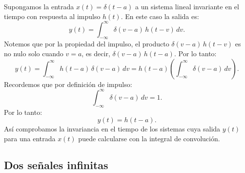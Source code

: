 Supongamos la entrada $x(t) = \delta(t-a)$ a un sistema lineal invariante en el tiempo con respuesta al impulso $h(t)$. En este caso la salida es:
\begin{equation}
	y(t) = \int_{-\infty}^{\infty} \delta(v - a) \, h(t - v) \, dv.
\end{equation}
Notemos que por la propiedad del impulso, el producto $\delta(v - a) \, h(t - v)$ es no nulo solo cuando $v = a$, es decir, $\delta(v - a) \, h(t - a)$. Por lo tanto:
\begin{equation}
	y(t) = \int_{-\infty}^{\infty} h(t - a) \, \delta(v - a ) \, dv = h(t - a) \left( \int_{-\infty}^{\infty} \delta(v - a ) \, dv \right).
\end{equation}
Recordemos que por definición de impulso:
\begin{equation}
	\int_{-\infty}^{\infty} \delta(v - a ) \, dv = 1.
\end{equation}
Por lo tanto:
\begin{equation}
	y(t) = h(t - a).
\end{equation}
Así comprobamos la invariancia en el tiempo de los sistemas cuya salida $y(t)$ para una entrada $x(t)$ puede calcularse con la integral de convolución.

\subsection{Dos señales infinitas}

